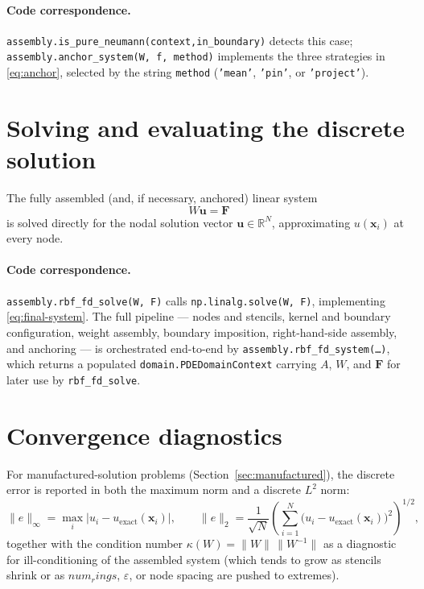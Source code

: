 \documentclass[11pt]{article}
\newcommand{\bx}{\mathbf{x}}
\newcommand{\R}{\mathbb{R}}
\begin{document}
\paragraph{Code correspondence.}
\texttt{assembly.is\_pure\_neumann(context,in\_boundary)} detects this
case; \texttt{assembly.anchor\_system(W, f, method)} implements the
three strategies in \eqref{eq:anchor}, selected by the string
\texttt{method} (\texttt{'mean'}, \texttt{'pin'}, or \texttt{'project'}).

\section{Solving and evaluating the discrete solution}

The fully assembled (and, if necessary, anchored) linear system
\begin{equation}
  W\mathbf{u} = \mathbf{F}
  \label{eq:final-system}
\end{equation}
is solved directly for the nodal solution vector $\mathbf{u} \in
\R^N$, approximating $u(\bx_i)$ at every node.

\paragraph{Code correspondence.}
\texttt{assembly.rbf\_fd\_solve(W, F)} calls
\texttt{np.linalg.solve(W, F)}, implementing \eqref{eq:final-system}.
The full pipeline --- nodes and stencils, kernel and boundary
configuration, weight assembly, boundary imposition, right-hand-side
assembly, and anchoring --- is orchestrated end-to-end by
\texttt{assembly.rbf\_fd\_system(\dots)}, which returns a populated
\texttt{domain.PDEDomainContext} carrying $A$, $W$, and $\mathbf{F}$
for later use by \texttt{rbf\_fd\_solve}.

\section{Convergence diagnostics}

For manufactured-solution problems (Section~\ref{sec:manufactured}),
the discrete error is reported in both the maximum norm and a
discrete $L^2$ norm:
\begin{equation}
  \|e\|_\infty = \max_i |u_i - u_{\text{exact}}(\bx_i)|,
  \qquad
  \|e\|_{2} = \frac{1}{\sqrt{N}}
  \left(\sum_{i=1}^N \big(u_i - u_{\text{exact}}(\bx_i)\big)^2\right)^{1/2},
  \label{eq:errors}
\end{equation}
together with the condition number $\kappa(W) =
\|W\|\,\|W^{-1}\|$ as a diagnostic for ill-conditioning of the
assembled system (which tends to grow as stencils shrink or as $num_rings$,
$\varepsilon$, or node spacing are pushed to extremes).
\end{document}
